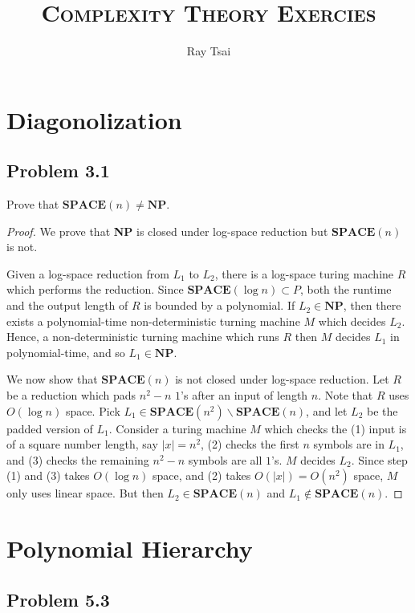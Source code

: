 \documentclass[a4paper]{article}
\title{\textsc{Complexity Theory Exercies}}
\author{Ray Tsai}
\date{}
\begin{document}
\maketitle

\section*{Diagonolization}

\subsection*{Problem 3.1} 

Prove that $\textbf{SPACE}(n) \neq \textbf{NP}$.

\begin{proof}
  We prove that \textbf{NP} is closed under log-space reduction but $\textbf{SPACE}(n)$ is not. 

  Given a log-space reduction from $L_1$ to $L_2$, there is a log-space turing machine $R$ which performs the reduction. Since $\textbf{SPACE}(\log n) \subset P$, both the runtime and the output length of $R$ is bounded by a polynomial. If $L_2 \in \textbf{NP}$, then there exists a polynomial-time non-deterministic turning machine $M$ which decides $L_2$. Hence, a non-deterministic turning machine which runs $R$ then $M$ decides $L_1$ in polynomial-time, and so $L_1 \in \textbf{NP}$. 

  We now show that $\textbf{SPACE}(n)$ is not closed under log-space reduction. Let $R$ be a reduction which pads $n^2 - n$ $1$'s after an input of length $n$. Note that $R$ uses $O(\log n)$ space. Pick $L_1 \in \textbf{SPACE}(n^2) \backslash \textbf{SPACE}(n)$, and let $L_2$ be the padded version of $L_1$. Consider a turing machine $M$ which checks the (1) input is of a square number length, say $|x| = n^2$, (2) checks the first $n$ symbols are in $L_1$, and (3) checks the remaining $n^2 - n$ symbols are all $1$'s. $M$ decides $L_2$. Since step (1) and (3) takes $O(\log n)$ space, and (2) takes $O(|x|) = O(n^2)$ space, $M$ only uses linear space. But then $L_2 \in \textbf{SPACE}(n)$ and $L_1 \notin \textbf{SPACE}(n)$. 
\end{proof}

\section*{Polynomial Hierarchy}

\subsection*{Problem 5.3}
\end{document}
